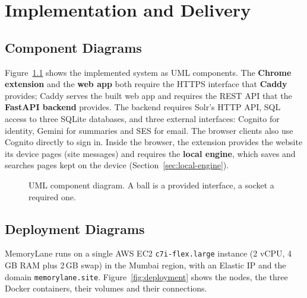 
\chapter{Implementation and Delivery}
\label{ch:implementation}

\section{Component Diagrams}

Figure~\ref{fig:components} shows the implemented system as UML components.
The \textbf{Chrome extension} and the \textbf{web app} both require the HTTPS
interface that \textbf{Caddy} provides; Caddy serves the built web app and
requires the REST API that the \textbf{FastAPI backend} provides. The backend
requires Solr's HTTP API, SQL access to three SQLite databases, and three
external interfaces: Cognito for identity, Gemini for summaries and SES for
email. The browser clients also use Cognito directly to sign in. Inside the
browser, the extension provides the website its device pages (site
messages) and requires the \textbf{local engine}, which saves and searches
pages kept on the device (Section~\ref{sec:local-engine}).

\begin{figure}[H]
\centering

\caption{UML component diagram. A ball is a provided interface, a socket a required one.}
\label{fig:components}
\end{figure}

\section{Deployment Diagrams}

MemoryLane runs on a single AWS EC2 \texttt{c7i-flex.large} instance (2 vCPU,
4\,GB RAM plus 2\,GB swap) in the Mumbai region, with an Elastic IP and the
domain \texttt{memorylane.site}. Figure~\ref{fig:deployment} shows the nodes,
the three Docker containers, their volumes and their connections.

